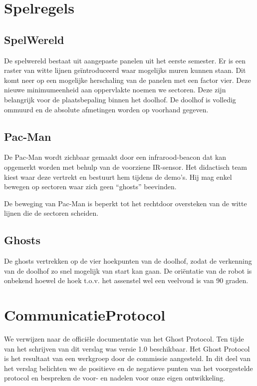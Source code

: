 \documentclass[12pt,a4paper]{report}
\begin{document}
\section{Spelregels}

\subsection{SpelWereld}

De spelwereld bestaat uit aangepaste panelen uit het eerste semester. Er is een raster van witte lijnen ge\"introduceerd waar mogelijks muren kunnen staan. Dit komt neer op een mogelijke herschaling van de panelen met een factor vier. Deze nieuwe minimumeenheid aan oppervlakte noemen we sectoren. Deze zijn belangrijk voor de plaatsbepaling binnen het doolhof. De doolhof is volledig ommuurd en de absolute afmetingen worden op voorhand gegeven.

\subsection{Pac-Man}

De Pac-Man wordt zichbaar gemaakt door een infrarood-beacon dat kan opgemerkt worden met behulp van de voorziene IR-sensor. Het didactisch team kiest waar deze vertrekt en bestuurt hem tijdens de demo's. Hij mag enkel bewegen op sectoren waar zich geen ``ghosts'' beevinden.

De beweging van Pac-Man is beperkt tot het rechtdoor oversteken van de witte lijnen die de sectoren scheiden.

\subsection{Ghosts}

De ghosts vertrekken op de vier hoekpunten van de doolhof, zodat de verkenning van de doolhof zo snel mogelijk van start kan gaan. De ori\"entatie van de robot is onbekend hoewel de hoek t.o.v. het assenstel wel een veelvoud is van 90 graden.


\section{CommunicatieProtocol}

We verwijzen naar de offici\"ele documentatie van het Ghost Protocol. Ten tijde van het schrijven van dit verslag was versie 1.0 beschikbaar. Het Ghost Protocol is het resultaat van een werkgroep door de commissie aangesteld. In dit deel van het verslag belichten we de positieve en de negatieve punten van het voorgestelde protocol en bespreken de voor- en nadelen voor onze eigen ontwikkeling.
\end{document}
